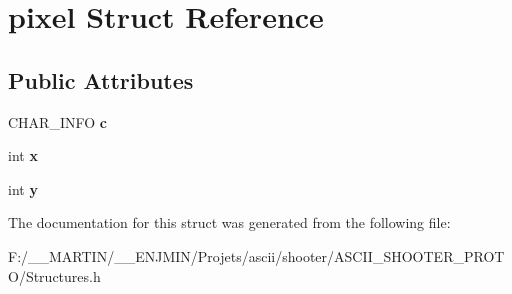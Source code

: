 \hypertarget{structpixel}{}\section{pixel Struct Reference}
\label{structpixel}
\subsection*{Public Attributes}
\begin{DoxyCompactItemize}
\item 
\hypertarget{structpixel_a9e2448882ee65d100d7f0d829cce90f5}{}\label{structpixel_a9e2448882ee65d100d7f0d829cce90f5} 
C\+H\+A\+R\+\_\+\+I\+N\+FO {\bfseries c}
\item 
\hypertarget{structpixel_abab54e3f587bb32bd669539eafb199f5}{}\label{structpixel_abab54e3f587bb32bd669539eafb199f5} 
int {\bfseries x}
\item 
\hypertarget{structpixel_ac8ce17202b68b5efe159e68c0fed89e9}{}\label{structpixel_ac8ce17202b68b5efe159e68c0fed89e9} 
int {\bfseries y}
\end{DoxyCompactItemize}


The documentation for this struct was generated from the following file\+:\begin{DoxyCompactItemize}
\item 
F\+:/\+\_\+\+\_\+\+M\+A\+R\+T\+I\+N/\+\_\+\+\_\+\+E\+N\+J\+M\+I\+N/\+Projets/ascii/shooter/\+A\+S\+C\+I\+I\+\_\+\+S\+H\+O\+O\+T\+E\+R\+\_\+\+P\+R\+O\+T\+O/Structures.\+h\end{DoxyCompactItemize}

